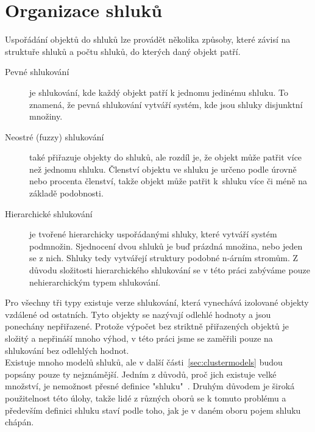 \section{Organizace shluků} \label{sec:clusterorganization}
Uspořádání objektů do shluků lze provádět několika způsoby, které závisí na struktuře shluků a počtu shluků, do kterých daný objekt patří.
\begin{description}
\item[Pevné shlukování] je shlukování, kde každý objekt patří k jednomu jedinému shluku. To znamená, že pevná shlukování vytváří systém, kde jsou shluky disjunktní množiny.
\item[Neostré (fuzzy) shlukování] také přiřazuje objekty do shluků, ale rozdíl je, že objekt může patřit více než jednomu shluku. Členství objektu ve shluku je určeno podle úrovně nebo procenta členství, takže objekt může patřit k~shluku více či méně na základě podobnosti.
\item[Hierarchické shlukování] je tvořené hierarchicky uspořádanými shluky, které vytváří systém podmnožin. Sjednocení dvou shluků je buď prázdná množina, nebo jeden se z nich. Shluky tedy vytvářejí struktury podobné n-árním stromům. Z důvodu složitosti hierarchického shlukování se v této práci zabýváme pouze nehierarchickým typem shlukování.
\end{description}
Pro všechny tři typy existuje verze shlukování, která vynechává izolované objekty vzdálené od ostatních. Tyto objekty se nazývají odlehlé hodnoty a jsou ponechány nepřiřazené. Protože výpočet bez striktně přiřazených objektů je složitý a nepřináší mnoho výhod, v této práci jsme se zaměřili pouze na shlukování bez odlehlých hodnot.\\

Existuje mnoho modelů shluků, ale v další části~\ref{sec:clustermodels} budou popsány pouze ty nejznámější. Jedním z důvodů, proč jich existuje velké množství, je nemožnost přesné definice "shluku"~\cite{EstivillCastro02}. Druhým důvodem je široká použitelnost této úlohy, takže lidé z různých oborů se k tomuto problému a především definici shluku staví podle toho, jak je v daném oboru pojem shluku chápán.\\

